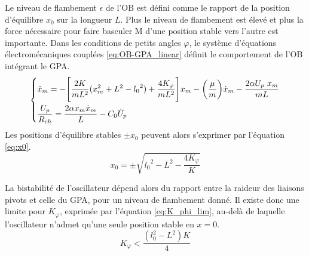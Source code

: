 Le niveau de flambement $\epsilon$ de l'OB est défini comme le rapport de la position d'équilibre $x_0$ sur la longueur $L$. Plus le niveau de flambement est élevé et plus la force nécessaire pour faire basculer M d'une position stable vers l'autre est importante. Dans les conditions de petits angles $\varphi$, le système d'équations électromécaniques couplées \ref{eq:OB-GPA_linear} définit le comportement de l'OB intégrant le GPA.
\begin{equation}
\begin{dcases}
\ddot{x}_m = - \Biggl[ \frac{2K}{mL^2}( x_m^2+L^2 -{l_0}^2) + \frac{4K_{\varphi}}{mL^2} \Biggr]x_m
	- \biggl( \frac{\mu}{m} \biggr) \dot{x}_m
	- \frac{2\alpha U_p\ x_m}{mL} \\
\dfrac{U_p}{R_{ch}} = \frac{2\alpha x_m \dot{x}_m}{L} - C_0\dot{U}_p
\end{dcases}
\label{eq:OB-GPA_linear}
\end{equation}
Les positions d'équilibre stables $\pm x_0$ peuvent alors s'exprimer par l'équation \ref{eq:x0}.
\begin{equation}
x_0 = \pm \sqrt{{l_0}^2-L^2-\frac{4K_{\varphi}}{K}}
\label{eq:x0}
\end{equation}


La bistabilité de l'oscillateur dépend alors du rapport entre la raideur des liaisons pivots et celle du GPA, pour un niveau de flambement donné. Il existe donc une limite pour $K_{\varphi}$, exprimée par l'équation \ref{eq:K_phi_lim}, au-delà de laquelle l'oscillateur n'admet qu'une seule position stable en $x=0$.
\begin{equation}
K_{\varphi} < \frac{(l_0^2-L^2)K}{4}
\label{eq:K_phi_lim}
\end{equation}


